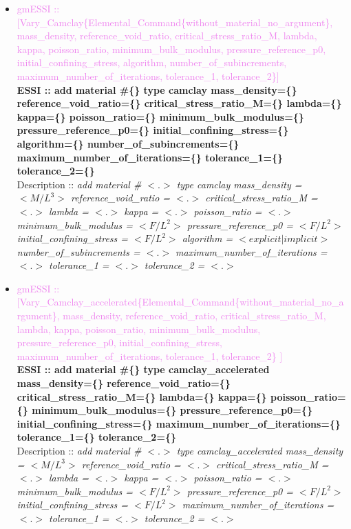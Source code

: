 \documentclass[11pt]{article}
\begin{document}
\begin{itemize}
    \item \textcolor{violet}{gmESSI :: [Vary\_Camclay\{Elemental\_Command\{without\_material\_no\_argument\}, mass\_density, reference\_void\_ratio, critical\_stress\_ratio\_M, lambda, kappa, poisson\_ratio, minimum\_bulk\_modulus, pressure\_reference\_p0, initial\_confining\_stress, algorithm, number\_of\_subincrements, maximum\_number\_of\_iterations, tolerance\_1, tolerance\_2\}]}\\
    \textbf{ESSI :: add material \#\{\} type camclay mass\_density=\{\} reference\_void\_ratio=\{\} critical\_stress\_ratio\_M=\{\} lambda=\{\} kappa=\{\} poisson\_ratio=\{\} minimum\_bulk\_modulus=\{\} pressure\_reference\_p0=\{\} initial\_confining\_stress=\{\} algorithm=\{\} number\_of\_subincrements=\{\} maximum\_number\_of\_iterations=\{\} tolerance\_1=\{\} tolerance\_2=\{\}}\\
    Description ::  \textit{ add material \# $<.>$ type camclay mass\_density = $<M/L^3>$ reference\_void\_ratio = $<.>$ critical\_stress\_ratio\_M = $<.>$ lambda = $<.>$ kappa = $<.>$ poisson\_ratio = $<.>$ minimum\_bulk\_modulus = $<F/L^2>$ pressure\_reference\_p0 = $<F/L^2>$ initial\_confining\_stress = $<F/L^2>$ algorithm = $<explicit|implicit>$  number\_of\_subincrements = $<.>$ maximum\_number\_of\_iterations = $<.>$ tolerance\_1 = $<.>$ tolerance\_2 = $<.>$} 

    \item \textcolor{violet}{gmESSI :: [Vary\_Camclay\_accelerated\{Elemental\_Command\{without\_material\_no\_argument\}, mass\_density, reference\_void\_ratio, critical\_stress\_ratio\_M, lambda, kappa, poisson\_ratio, minimum\_bulk\_modulus, pressure\_reference\_p0, initial\_confining\_stress, maximum\_number\_of\_iterations, tolerance\_1, tolerance\_2\} ]}\\
    \textbf{ESSI :: add material \#\{\} type camclay\_accelerated mass\_density=\{\} reference\_void\_ratio=\{\} critical\_stress\_ratio\_M=\{\} lambda=\{\} kappa=\{\} poisson\_ratio=\{\} minimum\_bulk\_modulus=\{\} pressure\_reference\_p0=\{\} initial\_confining\_stress=\{\}  maximum\_number\_of\_iterations=\{\} tolerance\_1=\{\} tolerance\_2=\{\}}\\
    Description ::  \textit{ add material \# $<.>$ type camclay\_accelerated mass\_density = $<M/L^3>$ reference\_void\_ratio = $<.>$ critical\_stress\_ratio\_M = $<.>$ lambda = $<.>$ kappa = $<.>$ poisson\_ratio = $<.>$ minimum\_bulk\_modulus = $<F/L^2>$ pressure\_reference\_p0 = $<F/L^2>$ initial\_confining\_stress = $<F/L^2>$  maximum\_number\_of\_iterations = $<.>$ tolerance\_1 = $<.>$ tolerance\_2 = $<.>$} 


\end{itemize}
\end{document}
